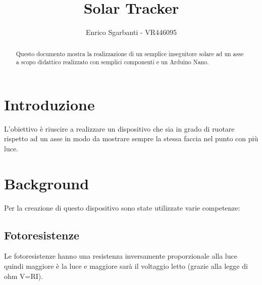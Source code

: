 \documentclass[12pt,oneside,a4paper]{article}
\title{\textbf{Solar Tracker}}
\author{Enrico Sgarbanti - VR446095}
\begin{document}
\maketitle



\begin{abstract}
    Questo documento mostra la realizzazione di un semplice inseguitore solare ad un asse a scopo didattico realizzato con semplici componenti e un Arduino Nano.
\end{abstract}



\section{Introduzione}
L'obiettivo è riuscire a realizzare un dispositivo che sia in grado di ruotare rispetto ad un asse in modo da mostrare sempre la stessa faccia nel punto con più luce.



\section{Background}
Per la creazione di questo dispositivo sono state utilizzate varie competenze:


\subsection{Fotoresistenze}Le fotoresistenze hanno una resistenza inversamente proporzionale alla luce quindi maggiore è la luce e maggiore sarà il voltaggio letto (grazie alla legge di ohm V=RI).
\end{document}

